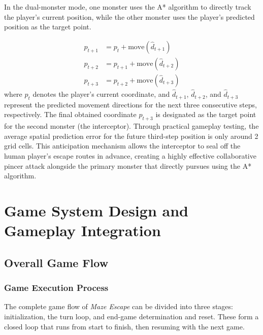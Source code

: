 \documentclass[12pt,a4paper]{article}
\begin{document}
In the dual-monster mode, one monster uses the A* algorithm to directly track the player's current position, while the other monster uses the player's predicted position as the target point.

\begin{align*}
    p_{t+1} &= p_t + \text{move}(\hat{d}_{t+1}) \\
    p_{t+2} &= p_{t+1} + \text{move}(\hat{d}_{t+2}) \\
    p_{t+3} &= p_{t+2} + \text{move}(\hat{d}_{t+3})
\end{align*}
where $p_t$ denotes the player's current coordinate, and $\hat{d}_{t+1}$, $\hat{d}_{t+2}$, and $\hat{d}_{t+3}$ represent the predicted movement directions for the next three consecutive steps, respectively. The final obtained coordinate $p_{t+3}$ is designated as the target point for the second monster (the interceptor). Through practical gameplay testing, the average spatial prediction error for the future third-step position is only around 2 grid cells. This anticipation mechanism allows the interceptor to seal off the human player's escape routes in advance, creating a highly effective collaborative pincer attack alongside the primary monster that directly pursues using the A* algorithm.

\section{Game System Design and Gameplay Integration}

\subsection{Overall Game Flow}

\subsubsection{Game Execution Process}

The complete game flow of \textit{Maze Escape} can be divided into three stages: initialization, the turn loop, and end-game determination and reset. These form a closed loop that runs from start to finish, then resuming with the next game.
\end{document}
